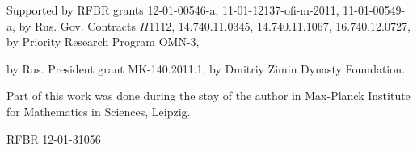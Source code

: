 Supported by RFBR grants 12-01-00546-a, 11-01-12137-ofi-m-2011, 11-01-00549-a, 
by Rus. Gov. Contracts $\Pi$1112, 14.740.11.0345, 14.740.11.1067, 16.740.12.0727,
by Priority Research Program OMN-3, %

by Rus. President grant MK-140.2011.1, by Dmitriy Zimin Dynasty
Foundation. %

Part of this work was done during the stay of the author
in Max-Planck Institute for Mathematics in Sciences, Leipzig. %

RFBR 12-01-31056 %

